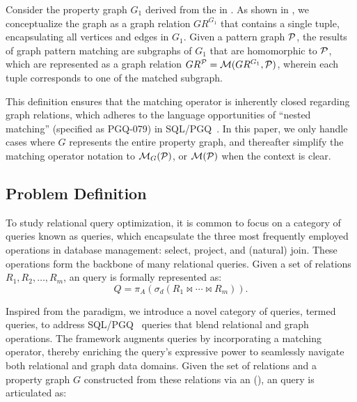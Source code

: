 \begin{example}
    \label{ex:matching}
    Consider the property graph \(G_1\) derived from the \rgmapping in . As shown in , we conceptualize the graph as a graph relation \(GR^{G_1}\) that contains a single tuple, encapsulating all vertices and edges in \(G_1\).
    Given a pattern graph \(\mathcal{P}\), the results of graph pattern matching are subgraphs of \(G_1\) that are homomorphic to \(\mathcal{P}\), which are represented as a graph relation \(GR^{\mathcal{P}} = \mathcal{M}(GR^{G_1}, \mathcal{P})\), wherein each tuple corresponds to one of the matched subgraph.
\end{example}

This definition ensures that the matching operator is inherently closed regarding graph relations,
which adheres to the language opportunities of ``nested matching'' (specified as PGQ-079) in SQL/PGQ~\cite{sql-pgq}.
In this paper, we only handle cases where $G$ represents the entire property graph, and thereafter simplify the matching operator notation to $\mathcal{M}_G(\mathcal{P})$, or $\mathcal{M}(\mathcal{P})$ when the context is clear.

\subsection{Problem Definition}
\label{sec:problem-definition}

To study relational query optimization, it is common to focus on a category of queries known as \spj queries,
which encapsulate the three most frequently employed operations in database management: select, project, and (natural) join.
These operations form the backbone of many relational queries. Given a set of relations \(R_1, R_2, \ldots, R_m\),
an \spj query is formally represented as:
\[
Q = \pi_A(\sigma_d(R_1 \Join \cdots \Join R_m)).
\]

Inspired from the \spj paradigm, we introduce a novel category of queries, termed \spjm queries, to address SQL/PGQ~\cite{sql-pgq} queries that
blend relational and graph operations. The \spjm framework augments \spj queries by incorporating a matching operator, thereby enriching the query's expressive power to seamlessly navigate both relational and graph data domains.
Given the set of relations and a property graph \(G\) constructed from these relations via an \rgmapping (),
an \spjm query is articulated as:

